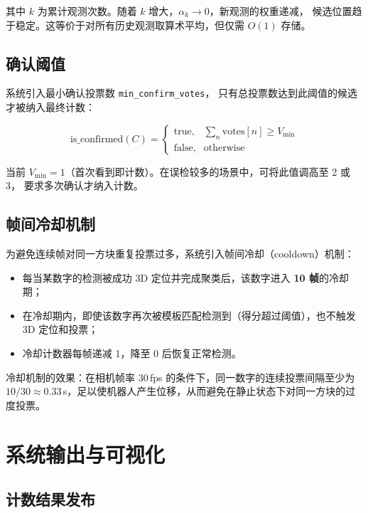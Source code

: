 \documentclass[12pt,a4paper]{article}
\begin{document}
其中 $k$ 为累计观测次数。随着 $k$ 增大，$\alpha_k \to 0$，新观测的权重递减，
候选位置趋于稳定。这等价于对所有历史观测取算术平均，但仅需 $O(1)$ 存储。

\subsection{确认阈值}

系统引入最小确认投票数 \texttt{min\_confirm\_votes}，
只有总投票数达到此阈值的候选才被纳入最终计数：

\begin{equation}
  \text{is\_confirmed}(C) = \begin{cases} \text{true}, & \sum_n \text{votes}[n] \geq V_{\min} \\
  \text{false}, & \text{otherwise} \end{cases}
  \label{eq:confirm}
\end{equation}

当前 $V_{\min} = 1$（首次看到即计数）。在误检较多的场景中，可将此值调高至 2 或 3，
要求多次确认才纳入计数。

\subsection{帧间冷却机制}

为避免连续帧对同一方块重复投票过多，系统引入帧间冷却（cooldown）机制：

\begin{itemize}
  \item 每当某数字的检测被成功 3D 定位并完成聚类后，该数字进入 \textbf{10 帧}的冷却期；
  \item 在冷却期内，即使该数字再次被模板匹配检测到（得分超过阈值），也不触发 3D 定位和投票；
  \item 冷却计数器每帧递减 1，降至 0 后恢复正常检测。
\end{itemize}

冷却机制的效果：在相机帧率 30\,fps 的条件下，同一数字的连续投票间隔至少为
$10/30 \approx 0.33$\,s，足以使机器人产生位移，从而避免在静止状态下对同一方块的过度投票。

\section{系统输出与可视化}

\subsection{计数结果发布}
\end{document}
